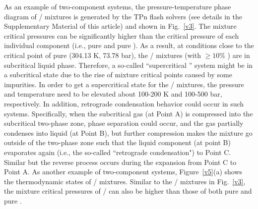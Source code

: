 As an example of two-component  systems, the pressure-temperature phase diagram of / mixtures is generated by the TPn flash solvers \cite{michelsen1982isothermal} (see details in the Supplementary Material of this article) and shown in Fig.~\ref{v3}. %
The mixture critical pressures can be significantly higher than the critical pressure of each individual component (i.e., pure  and pure ).
As a result, at conditions close to the critical point of pure  (304.13 K, 73.78 bar), the / mixtures (with $\ge10\%$ ) are in subcritical liquid phase. Therefore, a so-called ``supercritical '' system might be in a subcritical state due to the rise of mixture critical points caused by some impurities. In order to get a supercritical state for the / mixtures, the pressure and temperature need to be elevated about 100-200 K and 100-500 bar, respectively. %
In addition, retrograde condensation behavior could occur in such systems. %
Specifically, when the subcritical gas (at Point A) is compressed into the subcritical two-phase zone, phase separation could occur, and the gas partially condenses into liquid (at Point B), but further compression makes the mixture go outside of the two-phase zone such that the liquid component (at point B) evaporates again (i.e., the so-called ``retrograde condensation") to Point C. Similar but the reverse process occurs during the expansion from Point C to Point A.
As another example of two-component  systems, Figure~\ref{v5}(a) shows the thermodynamic states of / mixtures. Similar to the / mixtures in Fig.~\ref{v3}, the mixture critical pressures of / can also be higher than those of both pure  and pure .

